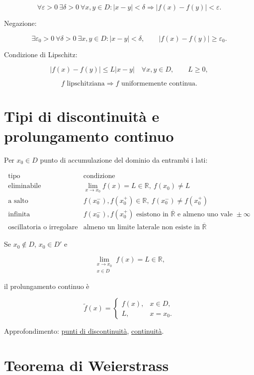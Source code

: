 \[
\forall\varepsilon>0\ \exists\delta>0\ \forall x,y\in D:
|x-y|<\delta
\Longrightarrow
|f(x)-f(y)|<\varepsilon.
\]

Negazione:

\[
\exists\varepsilon_0>0\ \forall\delta>0\ \exists x,y\in D:
|x-y|<\delta,
\qquad
|f(x)-f(y)|\ge\varepsilon_0.
\]

Condizione di Lipschitz:

\[
|f(x)-f(y)|\le L|x-y|
\quad\forall x,y\in D,
\qquad L\ge0,
\]

\[
f\text{ lipschitziana}
\Longrightarrow
f\text{ uniformemente continua}.
\]

\section{Tipi di discontinuità e prolungamento continuo}\label{tipi-di-discontinuituxe0-e-prolungamento-continuo}

Per \(x_0\in D\) punto di accumulazione del dominio da entrambi i lati:

\[
\begin{array}{c|c}
\text{tipo}&\text{condizione}\\
\hline
\text{eliminabile}&\lim_{x\to x_0}f(x)=L\in\mathbb R,\ f(x_0)\ne L\\
\text{a salto}&f(x_0^-),f(x_0^+)\in\mathbb R,\ f(x_0^-)\ne f(x_0^+)\\
\text{infinita}&f(x_0^-),f(x_0^+)\text{ esistono in }\overline{\mathbb R}
\text{ e almeno uno vale }\pm\infty\\
\text{oscillatoria o irregolare}&\text{almeno un limite laterale non esiste in }\overline{\mathbb R}
\end{array}
\]

Se \(x_0\notin D\), \(x_0\in D'\) e

\[
\lim_{\substack{x\to x_0\\x\in D}}f(x)=L\in\mathbb R,
\]

il prolungamento continuo è

\[
\widetilde f(x)=
\begin{cases}
f(x),&x\in D,\\
L,&x=x_0.
\end{cases}
\]

Approfondimento: \href{https://ingegnerismo.it/matematica/punti-di-discontinuita/}{punti di discontinuità}, \href{https://ingegnerismo.it/matematica/continuita/}{continuità}.

\section{Teorema di Weierstrass}\label{teorema-di-weierstrass}

